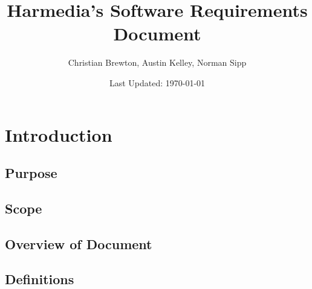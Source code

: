 \documentclass[12pt,a4paper,onesie,titlepage,draft]{article}
\begin{document}
\title{Harmedia's Software Requirements Document}
\author{Christian Brewton, Austin Kelley, Norman Sipp}
\date{Last Updated: \today}
\maketitle

\tableofcontents
\newpage
\section{Introduction}
\subsection{Purpose}
\subsection{Scope}
\subsection{Overview of Document}
\subsection{Definitions}
\end{document}
